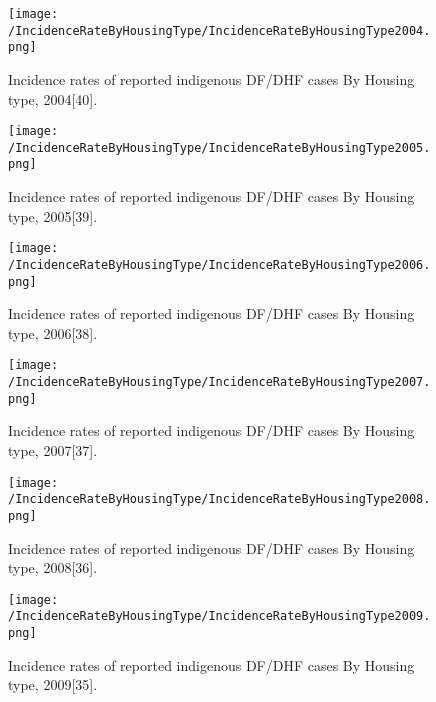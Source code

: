 \documentclass[11pt]{exam}
\begin{document}
\begin{questions}
\begin{enumerate}
\begin{figure}[H]
  \centering
   \texttt{[image: /IncidenceRateByHousingType/IncidenceRateByHousingType2004.png]} 
  \caption{Incidence rates of reported indigenous DF/DHF cases By Housing type, 2004[40].}
   \label{Incidence rate of indigenous DF/DHF cases by housing type.}
\end{figure} 

\begin{figure}[H]
  \centering
   \texttt{[image: /IncidenceRateByHousingType/IncidenceRateByHousingType2005.png]} 
  \caption{Incidence rates of reported indigenous DF/DHF cases By Housing type, 2005[39].}
   \label{Incidence rate of indigenous DF/DHF cases by housing type.}
\end{figure} 

\begin{figure}[H]
  \centering
   \texttt{[image: /IncidenceRateByHousingType/IncidenceRateByHousingType2006.png]} 
  \caption{Incidence rates of reported indigenous DF/DHF cases By Housing type, 2006[38].}
   \label{Incidence rate of indigenous DF/DHF cases by housing type.}
\end{figure} 

\begin{figure}[H]
  \centering
   \texttt{[image: /IncidenceRateByHousingType/IncidenceRateByHousingType2007.png]} 
  \caption{Incidence rates of reported indigenous DF/DHF cases By Housing type, 2007[37].}
   \label{Incidence rate of indigenous DF/DHF cases by housing type.}
\end{figure} 

\begin{figure}[H]
  \centering
   \texttt{[image: /IncidenceRateByHousingType/IncidenceRateByHousingType2008.png]} 
  \caption{Incidence rates of reported indigenous DF/DHF cases By Housing type, 2008[36].}
   \label{Incidence rate of indigenous DF/DHF cases by housing type.}
\end{figure} 

\begin{figure}[H]
  \centering
   \texttt{[image: /IncidenceRateByHousingType/IncidenceRateByHousingType2009.png]} 
  \caption{Incidence rates of reported indigenous DF/DHF cases By Housing type, 2009[35].}
   \label{Incidence rate of indigenous DF/DHF cases by housing type.}
\end{figure} 


\end{enumerate}
\end{questions}
\end{document}
